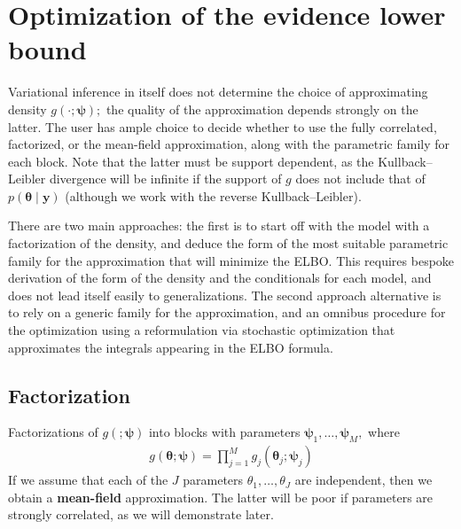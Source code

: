 \documentclass[
  11pt,
  letterpaper,
]{scrbook}
\theoremstyle{plain}
\theoremstyle{definition}
\theoremstyle{definition}
\theoremstyle{plain}
\theoremstyle{plain}
\theoremstyle{definition}
\theoremstyle{remark}
\begin{document}
\section{Optimization of the evidence lower
bound}\label{optimization-of-the-evidence-lower-bound}

Variational inference in itself does not determine the choice of
approximating density \(g(\cdot; \boldsymbol{\psi});\) the quality of
the approximation depends strongly on the latter. The user has ample
choice to decide whether to use the fully correlated, factorized, or the
mean-field approximation, along with the parametric family for each
block. Note that the latter must be support dependent, as the
Kullback--Leibler divergence will be infinite if the support of \(g\)
does not include that of \(p(\boldsymbol{\theta} \mid \boldsymbol{y})\)
(although we work with the reverse Kullback--Leibler).

There are two main approaches: the first is to start off with the model
with a factorization of the density, and deduce the form of the most
suitable parametric family for the approximation that will minimize the
ELBO. This requires bespoke derivation of the form of the density and
the conditionals for each model, and does not lead itself easily to
generalizations. The second approach alternative is to rely on a generic
family for the approximation, and an omnibus procedure for the
optimization using a reformulation via stochastic optimization that
approximates the integrals appearing in the ELBO formula.

\subsection{Factorization}\label{factorization}

Factorizations of \(g(;\boldsymbol{\psi})\) into blocks with parameters
\(\boldsymbol{\psi}_1, \ldots, \boldsymbol{\psi}_M,\) where
\begin{align*}
g(\boldsymbol{\theta}; \boldsymbol{\psi}) = \prod_{j=1}^M g_j(\boldsymbol{\theta}_j; \boldsymbol{\psi}_j)
\end{align*} If we assume that each of the \(J\) parameters
\(\theta_1, \ldots, \theta_J\) are independent, then we obtain a
\textbf{mean-field} approximation. The latter will be poor if parameters
are strongly correlated, as we will demonstrate later.
\end{document}
